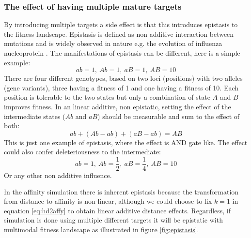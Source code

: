 \subsubsection{The effect of having multiple mature targets}
By introducing multiple targets a side effect is that this introduces epistasis to the fitness landscape.
Epistasis is defined as non additive interaction between mutations and is widely observed in nature e.g. the evolution of influenza nucleoprotein \cite{gong2013stability}.
The manifestations of epistasis can be different, here is a simple example:
$$
ab = 1,\ Ab = 1,\ aB = 1,\ AB = 10
$$
There are four different genotypes, based on two loci (positions) with two alleles (gene variants), three having a fitness of 1 and one having a fitness of 10.
Each position is tolerable to the two states but only a combination of state $A$ and $B$ improves fitness.
In an linear additive, non epistatic, setting the effect of the intermediate states ($Ab$ and $aB$) should be measurable and sum to the effect of both:
$$
ab + (Ab - ab) + (aB -ab) = AB
$$
This is just one example of epistasis, where the effect is AND gate like.
The effect could also confer deleteriousness to the intermediate:
$$
ab = 1,\ Ab = \frac{1}{2},\ aB = \frac{1}{4},\ AB = 10
$$
Or any other non additive influence.

In the affinity simulation there is inherent epistasis because the transformation from distance to affinity is non-linear, although we could choose to fix $k=1$ in equation \ref{eq:hd2affy} to obtain linear additive distance effects.
Regardless, if simulation is done using multiple different targets it will be epistatic with multimodal fitness landscape as illustrated in figure \ref{fig:epistasis}.

